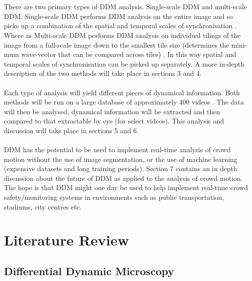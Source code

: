 \documentclass[11pt]{article}
\begin{document}
\\\\
There are two primary types of DDM analysis. Single-scale DDM and multi-scale DDM. Single-scale DDM performs DDM analysis on the entire image and so picks up a combination of the spatial and temporal scales of synchronisation \cite{ddm2}. Where as Multi-scale DDM performs DDM analysis on individual tilings of the image from a full-scale image down to the smallest tile size (determines the mini-mum wave-vector that can be compared across tiles) \cite{ddm2}. In this way spatial and temporal scales of synchronisation can be picked up separately. A more in-depth description of the two methods will take place in sections 3 and 4.  
\\\\
Each type of analysis will yield different pieces of dynamical information. Both methods will be run on a large database of approximately 400 videos \cite{crowdMotionDB}. The data will then be analysed, dynamical information will be extracted and then compared to that extractable by eye (for select videos). This analysis and discussion will take place in sections 5 and 6.
\\\\
DDM has the potential to be used to implement real-time analysis of crowd motion without the use of image segmentation, or the use of machine learning (expensive datasets and long training periods). Section 7 contains an in depth discussion about the future of DDM as applied to the analysis of crowd motion. The hope is that DDM might one day be used to help implement real-time crowd safety/monitoring systems in environments such as public transportation, stadiums, city centres etc.


\section{Literature Review}
\subsection{Differential Dynamic Microscopy}
\end{document}
